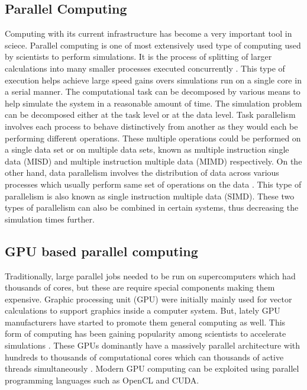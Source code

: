 \documentclass[preprint,10pt,authoryear]{elsarticle}
\begin{document}
\begin{linenumbers}
\subsection{Parallel Computing}
Computing with its current infrastructure has become a very important tool in sciece. 
Parallel computing is one of most extensively used type of computing used by scientists 
to perform simulations. It is the process of splitting of larger calculations into 
many smaller processes executed concurrently \citep{Almasi1989}. This type of execution 
helps achieve large speed gains overs simulations run on a single core in a serial manner.
The computational task can be decomposed by various means to help simulate the system 
in a reasonable amount of time. The simulation problem can be decomposed either 
at the task level or at the data level. Task parallelism involves each process to 
behave distinctively from another as they would each be performing different operations. 
These multiple operations could be performed on a single data set or on multiple data 
sets, known as multiple instruction single data (MISD) and multiple instruction 
multiple data (MIMD) respectively. On the other hand, data parallelism 
involves the distribution of data across various processes which usually perform same set of 
operations on the data \citep{solihin2015}. This type of parallelism is also known 
as single instruction multiple data (SIMD). These two types of parallelism can also 
be combined in certain systems, thus decreasing the simulation times further.

\subsection{GPU based parallel computing}
Traditionally, large parallel jobs needed to be run on supercomputers which had thousands 
of cores, but these are require special components making them expensive.
Graphic processing unit (GPU) were initially mainly used for vector calculations to support 
graphics inside a computer system. But, lately GPU manufacturers have started to promote them 
general computing as well. This form of computing has been gaining popularity among scientists 
to accelerate simulations \citep{kandrot2011}. These GPUs dominantly have a 
massively parallel architecture with hundreds to thousands of computational cores 
which can thousands of active threads simultaneously \citep{keckler2011}. 
Modern GPU computing can be exploited using parallel programming languages 
such as OpenCL and CUDA. 


\end{linenumbers}
\end{document}

